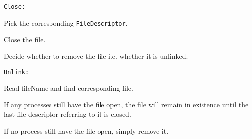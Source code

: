 \documentclass{article}
\begin{document}
\begin{compactitem}
\begin{compactitem}
	\end{compactitem}
\item \texttt{Close:}
	\begin{compactitem}
		\item Pick the corresponding \texttt{FileDescriptor}.
		\item Close the file.
		\item Decide whether to remove the file i.e. whether it is unlinked.
	\end{compactitem}
\item \texttt{Unlink:}
	\begin{compactitem}
		\item Read fileName and find corresponding file.
		\item If any processes still have the file open, the file will remain in existence until the last file descriptor referring to it is closed. 
		\item If no process still have the file open, simply remove it.
	\end{compactitem}
\end{compactitem}
\end{document}
